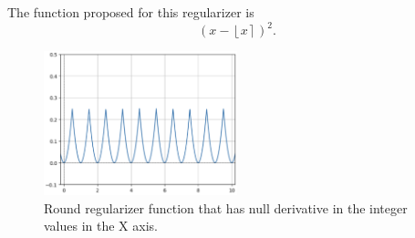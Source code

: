 \documentclass[12pt]{extarticle}
\numberwithin{equation}{section}
\begin{document}
The function proposed for this regularizer is
\[
    (x - \left\lfloor x \right\rceil )^2.
\]
\begin{figure}[H]
    \centering
    \includegraphics[width=0.5\textwidth]{images/round_integers}
    \caption{Round regularizer function that has null derivative in the integer values in the X axis.}
\end{figure}
\end{document}
